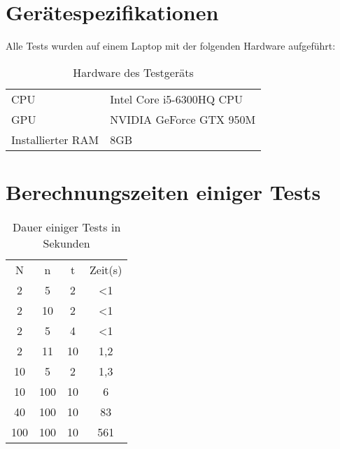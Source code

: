 \chapter{Gerätespezifikationen}

Alle Tests wurden auf einem Laptop mit der folgenden Hardware aufgeführt:


   \begin{table}[!h]
     \centering
     \begin{tabular}{ll}
     CPU & Intel Core i5-6300HQ CPU\\
     GPU & NVIDIA GeForce GTX 950M\\
     Installierter RAM & 8GB
     \end{tabular}

     \caption{Hardware des Testgeräts}
     \label{tbl:Hardware}

   \end{table}

\chapter{Berechnungszeiten einiger Tests}

\begin{table}[!h]
     \centering
     \begin{tabular}{ccc|c}
     N & n & t & Zeit(s)\\
     2 & 5 & 2 & <1\\
     2 & 10 & 2& <1\\
     2 & 5 & 4 & <1\\
     2 & 11 & 10 & 1,2\\
     10 & 5 & 2 & 1,3\\
	 10	& 100 & 10 & 6\\
     40 & 100 & 10 & 83\\
	 100 &100 & 10 & 561\\
     \end{tabular}

     \caption{Dauer einiger Tests in Sekunden}
     \label{tbl:Times}

\end{table}